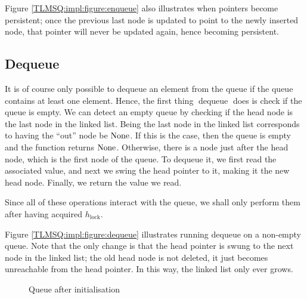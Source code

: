 \documentclass[a4paper, 10pt]{report}
\theoremstyle{definition}
\newcommand{\dequeue}{\operatorname{dequeue}}
\newcommand{\locinM}[1]{\loc_{#1\_\mathrm{in}}}
\newcommand{\locoutM}[1]{\loc_{#1\_\mathrm{out}}}
\newcommand{\locN}[1]{\loc_{\mathrm{#1}}}
\newcommand{\lochead}{\locN{head}}
\newcommand{\loctail}{\locN{tail}}
\newcommand{\node}{x}
\newcommand{\Hlock}{h_{\mathrm{lock}}}
\begin{document}
Figure \ref{TLMSQ:impl:figure:enqueue} also illustrates when pointers become persistent; once the previous last node is updated to point to the newly inserted node, that pointer will never be updated again, hence becoming persistent.

\subsection{Dequeue}

It is of course only possible to dequeue an element from the queue if the queue contains at least one element. Hence, the first thing $\dequeue$ does is check if the queue is empty. We can detect an empty queue by checking if the head node is the last node in the linked list. Being the last node in the linked list corresponds to having the ``out'' node be $\operatorname{None}$. If this is the case, then the queue is empty and the function returns $\operatorname{None}$. Otherwise, there is a node just after the head node, which is the first node of the queue. To dequeue it, we first read the associated value, and next we swing the head pointer to it, making it the new head node. Finally, we return the value we read.

Since all of these operations interact with the queue, we shall only perform them after having acquired $\Hlock$.

Figure \ref{TLMSQ:impl:figure:dequeue} illustrates running dequeue on a non-empty queue. Note that the only change is that the head pointer is swung to the next node in the linked list; the old head node is not deleted, it just becomes unreachable from the head pointer. In this way, the linked list only ever grows.

\begin{figure}
  \centering
  \begin{adjustbox}{center}
  \end{adjustbox}
  \caption{Queue after initialisation}
  \label{TLMSQ:impl:figure:init}
\end{figure}
\end{document}
